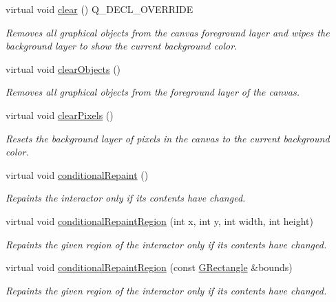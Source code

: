 \begin{DoxyCompactItemize}
virtual void \mbox{\hyperlink{classGCanvas_af220cadd1499c3586d48010a0348d9f8}{clear}} () Q\+\_\+\+D\+E\+C\+L\+\_\+\+O\+V\+E\+R\+R\+I\+DE
\begin{DoxyCompactList}\small\item\em Removes all graphical objects from the canvas foreground layer and wipes the background layer to show the current background color. \end{DoxyCompactList}\item 
virtual void \mbox{\hyperlink{classGCanvas_a6614e1320bc8e93b20df129613e5a0ff}{clear\+Objects}} ()
\begin{DoxyCompactList}\small\item\em Removes all graphical objects from the foreground layer of the canvas. \end{DoxyCompactList}\item 
virtual void \mbox{\hyperlink{classGCanvas_ab2c8590176aec1da6fb4e9b836bab630}{clear\+Pixels}} ()
\begin{DoxyCompactList}\small\item\em Resets the background layer of pixels in the canvas to the current background color. \end{DoxyCompactList}\item 
virtual void \mbox{\hyperlink{classGDrawingSurface_a221b3e75bb3d9d0bfea62b3364e6773b}{conditional\+Repaint}} ()
\begin{DoxyCompactList}\small\item\em Repaints the interactor only if its contents have changed. \end{DoxyCompactList}\item 
virtual void \mbox{\hyperlink{classGDrawingSurface_aedd4b792311d946eeaf44b0de337a408}{conditional\+Repaint\+Region}} (int x, int y, int width, int height)
\begin{DoxyCompactList}\small\item\em Repaints the given region of the interactor only if its contents have changed. \end{DoxyCompactList}\item 
virtual void \mbox{\hyperlink{classGDrawingSurface_a3932a12278752db368e24fa404e446aa}{conditional\+Repaint\+Region}} (const \mbox{\hyperlink{classGRectangle}{G\+Rectangle}} \&bounds)
\begin{DoxyCompactList}\small\item\em Repaints the given region of the interactor only if its contents have changed. \end{DoxyCompactList}\item 

\end{DoxyCompactItemize}
